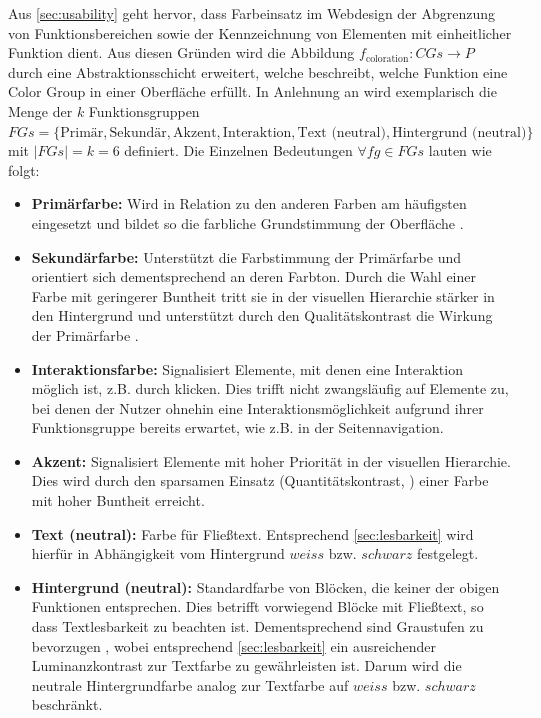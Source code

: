 Aus \autoref{sec:usability} geht hervor, dass Farbeinsatz im Webdesign der Abgrenzung von Funktionsbereichen sowie der Kennzeichnung von Elementen mit einheitlicher Funktion dient. Aus diesen Gründen wird die Abbildung $f_\text{coloration}: CGs \to P$ durch eine Abstraktionsschicht erweitert, welche beschreibt, welche Funktion eine Color Group in einer Oberfläche erfüllt. In Anlehnung an \citep{google,  smashing} wird exemplarisch die Menge der $k$ Funktionsgruppen $FGs = \{\text{Primär}, \text{Sekundär}, \text{Akzent}, \text{Interaktion}, \text{Text (neutral)}, \text{Hintergrund (neutral)}\}$ mit $|FGs| = k = 6$ definiert. Die Einzelnen Bedeutungen $\forall fg \in FGs$ lauten wie folgt:

\begin{itemize}
	\item \textbf{Primärfarbe:} Wird in Relation zu den anderen Farben am häufigsten eingesetzt und bildet so die farbliche Grundstimmung der Oberfläche \citep{awwwards}.
	\item \textbf{Sekundärfarbe:} Unterstützt die Farbstimmung der Primärfarbe und orientiert sich dementsprechend an deren Farbton. Durch die Wahl einer Farbe mit geringerer Buntheit tritt sie in der visuellen Hierarchie stärker in den Hintergrund \citep{visual-hierarchy} und unterstützt durch den Qualitätskontrast die Wirkung der Primärfarbe \citep{webdesign}.
	\item \textbf{Interaktionsfarbe:} Signalisiert Elemente, mit denen eine Interaktion möglich ist, z.B. durch klicken. Dies trifft nicht zwangsläufig auf Elemente zu, bei denen der Nutzer ohnehin eine Interaktionsmöglichkeit aufgrund ihrer Funktionsgruppe bereits erwartet, wie z.B. in der Seitennavigation.
	\item \textbf{Akzent:} Signalisiert Elemente mit hoher Priorität in der visuellen Hierarchie. Dies wird durch den sparsamen Einsatz (Quantitätskontrast, \citep{webdesign}) einer Farbe mit hoher Buntheit \citep{visual-hierarchy} erreicht.
	\item \textbf{Text (neutral):} Farbe für Fließtext. Entsprechend \autoref{sec:lesbarkeit} wird hierfür in Abhängigkeit vom Hintergrund $weiss$ bzw. $schwarz$ festgelegt.
	\item \textbf{Hintergrund (neutral):} Standardfarbe von Blöcken, die keiner der obigen Funktionen entsprechen. Dies betrifft vorwiegend Blöcke mit Fließtext, so dass Textlesbarkeit zu beachten ist. Dementsprechend sind Graustufen zu bevorzugen \citep{webx0}, wobei entsprechend \autoref{sec:lesbarkeit} ein ausreichender Luminanzkontrast zur Textfarbe zu gewährleisten ist. Darum wird die neutrale Hintergrundfarbe analog zur Textfarbe auf $weiss$ bzw. $schwarz$ beschränkt.
\end{itemize}

